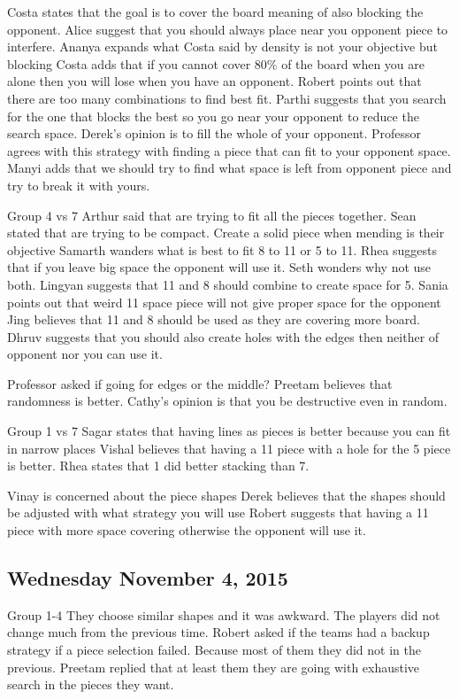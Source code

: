 Costa states that the goal is to cover the board meaning of also blocking the opponent.
Alice suggest that you should always place near you opponent piece to interfere.
Ananya expands what Costa said by density is not your objective but blocking
Costa adds that if you cannot cover 80\% of the board when you are alone then 
you will lose when you have an opponent.
Robert points out that there are too many combinations to find best fit.
Parthi suggests that you search for the one that blocks the best so you go near 
your opponent to reduce the search space.
Derek’s opinion is to fill the whole of your opponent.
Professor agrees with this strategy with finding a piece that can fit to your opponent space.
Manyi adds that we should try to find what space is left from opponent piece and 
try to break it with yours.

Group 4 vs 7
Arthur said that are trying to fit all the pieces together.
Sean stated that are trying to be compact. Create a solid piece when mending is their objective
Samarth wanders what is best to fit 8 to 11 or 5 to 11.
Rhea suggests that if you leave big space the opponent will use it.
Seth wonders why not use both.
Lingyan suggests that 11 and 8 should combine to create space for 5.
Sania points out that weird 11 space piece will not give proper space for the opponent
Jing believes that 11 and 8 should be used as they are covering more board.
Dhruv suggests that you should also create holes with the edges then neither of opponent nor you can use it.

Professor asked if going for edges or the middle?
Preetam believes that randomness is better.
Cathy’s opinion is that you be destructive even in random.

Group 1 vs 7
Sagar states that having lines as pieces is better because you can fit in narrow places
Vishal believes that having a 11 piece with a hole for the 5 piece is better.
Rhea states that 1 did better stacking than 7.

Vinay is concerned about the piece shapes
Derek believes that the shapes should be adjusted with what strategy you will use
Robert suggests that having a 11 piece with more space covering otherwise the opponent will use it.

\subsection{Wednesday November 4, 2015}
Group 1-4
They choose similar shapes and it was awkward.
The players did not change much from the previous time.
Robert asked if the teams had a backup strategy if a piece selection failed. Because most of them they did not in the previous.
Preetam replied that at least them they are going with exhaustive search in the pieces they want.

